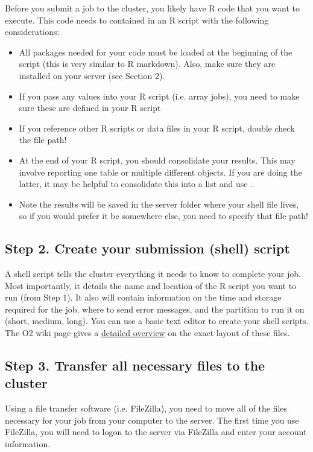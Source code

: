 \documentclass[11pt, oneside]{article}   	%
\begin{document}
Before you submit a job to the cluster, you likely have R code that you want to execute. This code needs to contained in an R script  with the following considerations: 

\begin{itemize}
	\item All packages needed for your code must be loaded at the beginning of the script (this is very similar to R markdown). Also, make sure they are installed on your server (see Section 2). 
	\item If you pass any values into your R script (i.e. array jobs), you need to make sure these are defined in your R script
	\item If you reference other R scripts or data files in your R script, double check the file path! 
	\item At the end of your R script, you should consolidate your results. This may involve reporting one table or multiple different objects. If you are doing the latter, it may be helpful to consolidate this into a list and use  \normalfont. 
	\item Note the results will be saved in the server folder where your shell file lives, so if you would prefer it be somewhere else, you need to specify that file path!
\end{itemize} 


\subsection*{Step 2. Create your submission (shell) script} 

A shell script tells the cluster everything it needs to know to complete your job. Most importantly, it details the name and location of the R script you want to run (from Step 1). It also will contain information on the time and storage required for the job, where to send error messages, and the partition to run it on (short, medium, long). You can use a basic text editor to create your shell scripts. The O2 wiki page gives a  \href{https://wiki.rc.hms.harvard.edu/display/O2/Using+Slurm+Basic}{detailed overview} on the exact layout of these files.

\subsection*{Step 3. Transfer all necessary files to the cluster} 

Using a file transfer software (i.e. FileZilla), you need to move all of the files necessary for your job from your computer to the server. The first time you use FileZilla, you will need to logon to the server via FileZilla and enter your account information.
\end{document}
